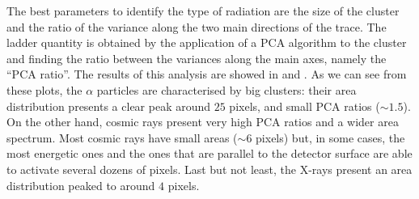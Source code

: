 \documentclass[../../main/main.tex]{subfiles}
\begin{document}
The best parameters to identify the type of radiation are the size of the cluster and the ratio of the variance along the two main directions of the trace.
The ladder quantity is obtained by the application of a PCA algorithm to the cluster and finding the ratio between the variances along the main axes, namely the ``PCA ratio''. The results of this analysis are showed in  and . As we can see from these plots, the \( \alpha \) particles are characterised by big clusters: their area distribution presents a clear peak around \( 25 \) pixels, and small PCA ratios (\( \sim 1.5 \)). On the other hand, cosmic rays present very high PCA ratios and a wider area spectrum. Most cosmic rays have small areas (\( \sim 6 \) pixels) but, in some cases, the most energetic ones and the ones that are parallel to the detector surface are able to activate several dozens of pixels. Last but not least, the X-rays present an area distribution peaked to around \( 4 \) pixels.
\end{document}
